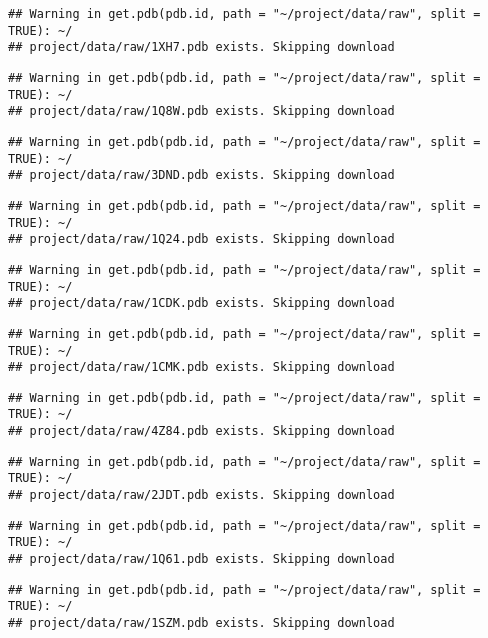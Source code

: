 \documentclass[
]{article}
\begin{document}
\begin{verbatim}
## Warning in get.pdb(pdb.id, path = "~/project/data/raw", split = TRUE): ~/
## project/data/raw/1XH7.pdb exists. Skipping download
\end{verbatim}

\begin{verbatim}
## Warning in get.pdb(pdb.id, path = "~/project/data/raw", split = TRUE): ~/
## project/data/raw/1Q8W.pdb exists. Skipping download
\end{verbatim}

\begin{verbatim}
## Warning in get.pdb(pdb.id, path = "~/project/data/raw", split = TRUE): ~/
## project/data/raw/3DND.pdb exists. Skipping download
\end{verbatim}

\begin{verbatim}
## Warning in get.pdb(pdb.id, path = "~/project/data/raw", split = TRUE): ~/
## project/data/raw/1Q24.pdb exists. Skipping download
\end{verbatim}

\begin{verbatim}
## Warning in get.pdb(pdb.id, path = "~/project/data/raw", split = TRUE): ~/
## project/data/raw/1CDK.pdb exists. Skipping download
\end{verbatim}

\begin{verbatim}
## Warning in get.pdb(pdb.id, path = "~/project/data/raw", split = TRUE): ~/
## project/data/raw/1CMK.pdb exists. Skipping download
\end{verbatim}

\begin{verbatim}
## Warning in get.pdb(pdb.id, path = "~/project/data/raw", split = TRUE): ~/
## project/data/raw/4Z84.pdb exists. Skipping download
\end{verbatim}

\begin{verbatim}
## Warning in get.pdb(pdb.id, path = "~/project/data/raw", split = TRUE): ~/
## project/data/raw/2JDT.pdb exists. Skipping download
\end{verbatim}

\begin{verbatim}
## Warning in get.pdb(pdb.id, path = "~/project/data/raw", split = TRUE): ~/
## project/data/raw/1Q61.pdb exists. Skipping download
\end{verbatim}

\begin{verbatim}
## Warning in get.pdb(pdb.id, path = "~/project/data/raw", split = TRUE): ~/
## project/data/raw/1SZM.pdb exists. Skipping download
\end{verbatim}
\end{document}
